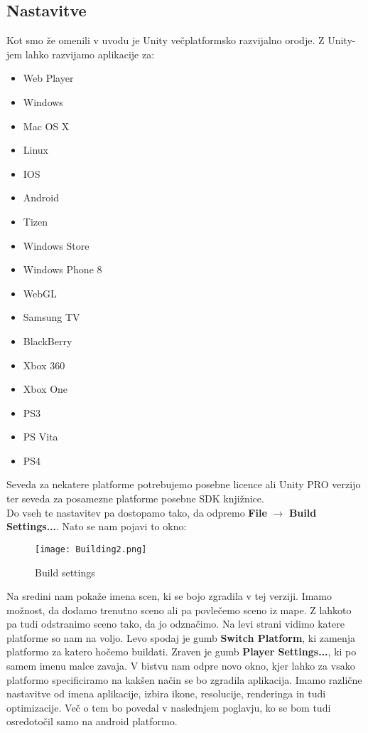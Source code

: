 {\color{indiagreen}\subsection{Nastavitve}}
Kot smo že omenili v uvodu je Unity večplatformsko razvijalno orodje. Z Unity-jem lahko razvijamo aplikacije za:
\begin{itemize}
	\item Web Player
	\item Windows
	\item Mac OS X
	\item Linux
	\item IOS
	\item Android
	\item Tizen
	\item Windows Store
	\item Windows Phone 8
	\item WebGL
	\item Samsung TV
	\item BlackBerry
	\item Xbox 360
	\item Xbox One
	\item PS3
	\item PS Vita
	\item PS4
\end{itemize}
Seveda za nekatere platforme potrebujemo posebne licence ali Unity PRO verzijo ter seveda za posamezne platforme posebne SDK knjižnice.\\
Do vseh te nastavitev pa dostopamo tako, da odpremo \textbf{File} $\rightarrow$ \textbf{Build Settings...}. Nato se nam pojavi to okno:\\
\begin{figure}[ht!]
	\centering
	\texttt{[image: Building2.png]}
	\caption{Build settings}
\end{figure}
Na sredini nam pokaže imena scen, ki se bojo zgradila v tej verziji. Imamo možnost, da dodamo trenutno sceno ali pa povlečemo sceno iz mape. Z lahkoto pa tudi odstranimo sceno tako, da jo odznačimo. Na levi strani vidimo katere platforme so nam na voljo. Levo spodaj je gumb \textbf{Switch Platform}, ki zamenja platformo za katero hočemo buildati. Zraven je gumb \textbf{Player Settings...}, ki po samem imenu malce zavaja. V bistvu nam odpre novo okno, kjer lahko za vsako platformo specificiramo na kakšen način se bo zgradila aplikacija. Imamo različne nastavitve od imena aplikacije, izbira ikone, resolucije, renderinga in tudi optimizacije. Več o tem bo povedal v naslednjem poglavju, ko se bom tudi osredotočil samo na android platformo.\\
